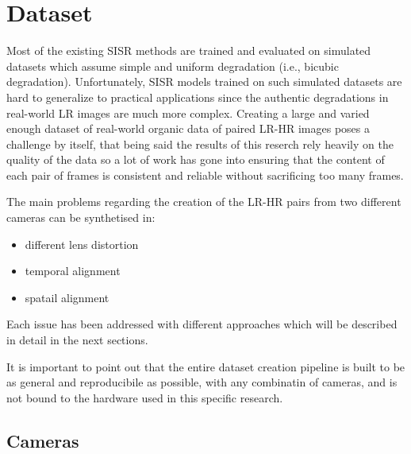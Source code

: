 \chapter{Dataset}
\label{cha:dataset}

Most of the existing SISR methods are trained and evaluated on simulated datasets which assume simple and uniform degradation (i.e., bicubic degradation). Unfortunately, SISR models trained on such simulated datasets are hard to generalize to practical applications since the authentic degradations in real-world LR images are much more complex\cite{cai2019realworld}. Creating a large and varied enough dataset of real-world organic data of paired LR-HR images poses a challenge by itself, that being said the results of this reserch rely heavily on the quality of the data so a lot of work has gone into ensuring that the content of each pair of frames is consistent and reliable without sacrificing too many frames.

The main problems regarding the creation of the LR-HR pairs from two different cameras can be synthetised in:
\begin{itemize}
  \item different lens distortion
  \item temporal alignment
  \item spatail alignment
\end{itemize}

Each issue has been addressed with different approaches which will be described in detail in the next sections.

It is important to point out that the entire dataset creation pipeline is built to be as general and reproducibile as possible, with any combinatin of cameras, and is not bound to the hardware used in this specific research.

\section{Cameras}
\label{sec:cameras}

